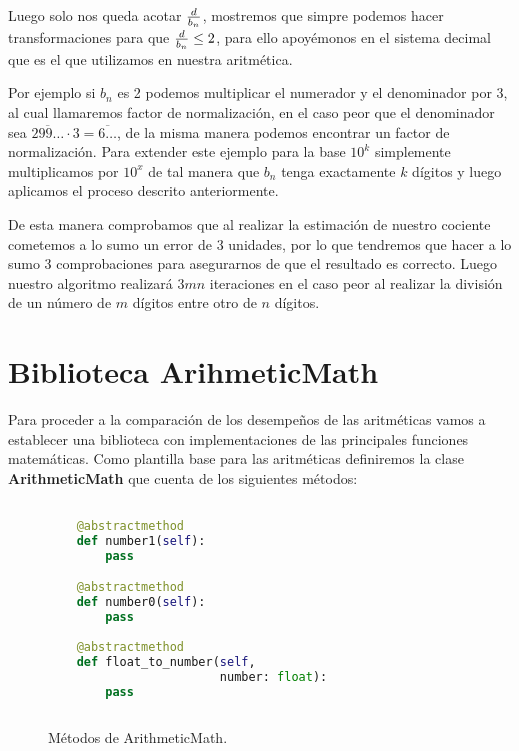 \documentclass[a4paper,10pt,twocolumn]{article}
\begin{document}
	Luego solo nos queda acotar ${d\over b_n}$, mostremos que simpre podemos hacer transformaciones para que ${d\over b_n}\leq 2$, para ello apoyémonos en el sistema decimal que es el que utilizamos en nuestra aritmética. 
	
	Por ejemplo si $b_n$ es 2 podemos multiplicar el numerador y el denominador por 3, al cual llamaremos factor de normalización, en el caso peor que el denominador sea $\overline{299\ldots} \cdot 3= \overline{6\ldots }$, de la misma manera podemos encontrar un factor de normalización. Para extender este ejemplo para la base $10^k$ simplemente multiplicamos por $10^x$ de tal manera que $b_n$ tenga exactamente $k$ dígitos y luego aplicamos el proceso descrito anteriormente.
	
	De esta manera comprobamos que al realizar la estimación de nuestro cociente cometemos a lo sumo un error de 3 unidades, por lo que tendremos que hacer a lo sumo 3 comprobaciones para asegurarnos de que el resultado es correcto. Luego nuestro algoritmo realizará $3mn$ iteraciones en el caso peor al realizar la división de un número de $m$ dígitos entre otro de $n$ dígitos. 
	
\section{Biblioteca ArihmeticMath}\label{sub:result}
	Para proceder a la comparación de los desempeños de las aritméticas vamos a establecer una biblioteca con implementaciones de las principales funciones matemáticas. Como plantilla base para las aritméticas definiremos la clase \textbf{ArithmeticMath} que cuenta de los siguientes métodos:
	

		\begin{figure}[htb]%
			\begin{lstlisting}[language=python]%

    @abstractmethod
    def number1(self):
        pass

    @abstractmethod
    def number0(self):
        pass
        
    @abstractmethod
    def float_to_number(self, 
                        number: float):
        pass
		
		\end{lstlisting}
		\caption{Métodos de ArithmeticMath.\label{fig:code}}
		\end{figure}
	
\end{document}
